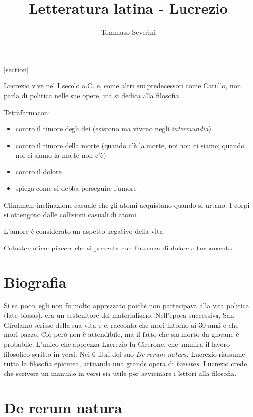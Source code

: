 \documentclass[10pt,a4paper]{article}
\author{Tommaso Severini}
\title{Letteratura latina -  Lucrezio}
\begin{document}
	\maketitle
	
	[section]
	
	Lucrezio vive nel I secolo a.C. e, come altri sui predecessori come Catullo, non parla di politica nelle sue opere, ma si dedica alla filosofia.
	
	Tetrafarmacon:
	\begin{itemize}
		\item contro il timore degli dei (esistono ma vivono negli \textit{intermundia})
		\item contro il timore della morte (quando c'è la morte, noi non ci siamo; quando noi ci siamo la morte non c'è)
		\item contro il dolore
		\item spiega come si debba perseguire l'amore
	\end{itemize}

	Clinamen: inclinazione casuale che gli atomi acquistano quando si urtano.
	I corpi si ottengono dalle collisioni casuali di atomi.
	
	L'amore è considerato un aspetto negativo della vita
	
	Catastematico: piacere che si presenta con l'assenza di dolore e turbamento
	
	\section{Biografia}
	
	Si sa poco, egli non fu molto apprezzato poichè non partecipava alla vita politica (late biosas), era un sostenitore del materialismo. Nell'epoca successiva, San Girolamo scrisse della sua vita e ci racconta che morì intorno ai 30 anni e che morì pazzo. Ciò però non è attendibile, ma il fatto che sia morto da giovane è probabile. L'unico che apprezza Lucrezio fu Cicerone, che ammira il lavoro filosofico scritto in versi. Nei 6 libri del suo \textit{De rerum natura}, Lucrezio riassume tutta la filosofia epicurea, attuando una grande opera di \textit{brevitas}. Lucrezio crede che scrivere un manuale in versi sia utile per avvicinare i lettori alla filosofia.
	
	\section{De rerum natura}
	
\end{document}
